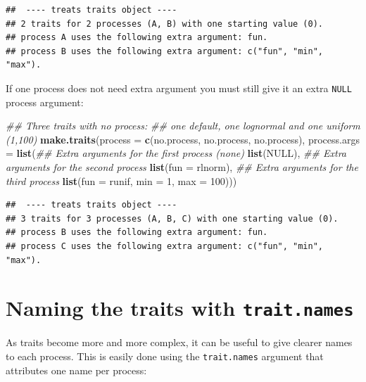 \documentclass[
]{book}
\newenvironment{Shaded}{\begin{snugshade}}{\end{snugshade}}
\newcommand{\CommentTok}[1]{\textcolor[rgb]{0.56,0.35,0.01}{\textit{#1}}}
\newcommand{\DataTypeTok}[1]{\textcolor[rgb]{0.13,0.29,0.53}{#1}}
\newcommand{\DecValTok}[1]{\textcolor[rgb]{0.00,0.00,0.81}{#1}}
\newcommand{\KeywordTok}[1]{\textcolor[rgb]{0.13,0.29,0.53}{\textbf{#1}}}
\newcommand{\NormalTok}[1]{#1}
\newcommand{\OtherTok}[1]{\textcolor[rgb]{0.56,0.35,0.01}{#1}}
\begin{document}
\begin{verbatim}
##  ---- treats traits object ---- 
## 2 traits for 2 processes (A, B) with one starting value (0).
## process A uses the following extra argument: fun.
## process B uses the following extra argument: c("fun", "min", "max").
\end{verbatim}

If one process does not need extra argument you must still give it an extra \texttt{NULL} process argument:

\begin{Shaded}
\begin{Highlighting}[]
\CommentTok{\#\# Three traits with no process:}
\CommentTok{\#\# one default, one lognormal and one uniform (1,100)}
\KeywordTok{make.traits}\NormalTok{(}\DataTypeTok{process      =} \KeywordTok{c}\NormalTok{(no.process, no.process, no.process),}
            \DataTypeTok{process.args =} \KeywordTok{list}\NormalTok{(}\CommentTok{\#\# Extra arguments for the first process (none)}
                                \KeywordTok{list}\NormalTok{(}\OtherTok{NULL}\NormalTok{),}
                                \CommentTok{\#\# Extra arguments for the second process}
                                \KeywordTok{list}\NormalTok{(}\DataTypeTok{fun =}\NormalTok{ rlnorm),}
                                \CommentTok{\#\# Extra arguments for the third process}
                                \KeywordTok{list}\NormalTok{(}\DataTypeTok{fun =}\NormalTok{ runif, }\DataTypeTok{min =} \DecValTok{1}\NormalTok{, }\DataTypeTok{max =} \DecValTok{100}\NormalTok{)))}
\end{Highlighting}
\end{Shaded}

\begin{verbatim}
##  ---- treats traits object ---- 
## 3 traits for 3 processes (A, B, C) with one starting value (0).
## process B uses the following extra argument: fun.
## process C uses the following extra argument: c("fun", "min", "max").
\end{verbatim}

\hypertarget{naming-the-traits-with-trait.names}{%
\section{\texorpdfstring{Naming the traits with \texttt{trait.names}}{Naming the traits with trait.names}}\label{naming-the-traits-with-trait.names}}

As traits become more and more complex, it can be useful to give clearer names to each process.
This is easily done using the \texttt{trait.names} argument that attributes one name per process:
\end{document}
